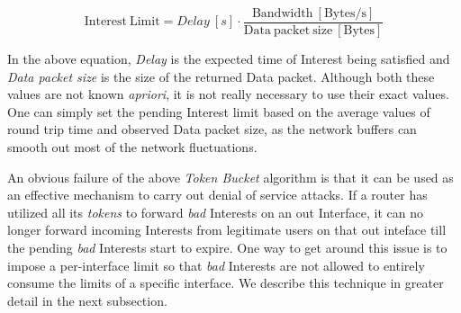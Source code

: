 \begin{equation}
\mathrm{Interest\ Limit} = Delay\ [s] \cdot \frac{\mathrm{Bandwidth\ [Bytes/s]}}{\mathrm{Data\ packet\ size\ [Bytes]}}
\end{equation}

In the above equation, \emph{Delay} is the expected time of Interest being satisfied and \emph{Data packet size} is the size of the returned Data packet.
Although both these values are not known {\it apriori}, it is not really necessary to use their exact values.
One can simply set the pending Interest limit based on the average values of round trip time and observed Data packet size, as the network buffers can smooth out most of the network fluctuations.

An obvious failure of the above {\it Token Bucket} algorithm is that it can be used as an effective mechanism to carry out denial of service attacks. If a router has utilized all its {\it tokens} to forward {\it bad} Interests on an out Interface, it can no longer forward incoming Interests from legitimate users on that out inteface till the pending {\it bad} Interests start to expire. One way to get around this issue is to impose a per-interface limit so that {\it bad} Interests are not allowed to entirely consume the limits of a specific interface. We describe this technique in greater detail in the next subsection.

%
%
%




